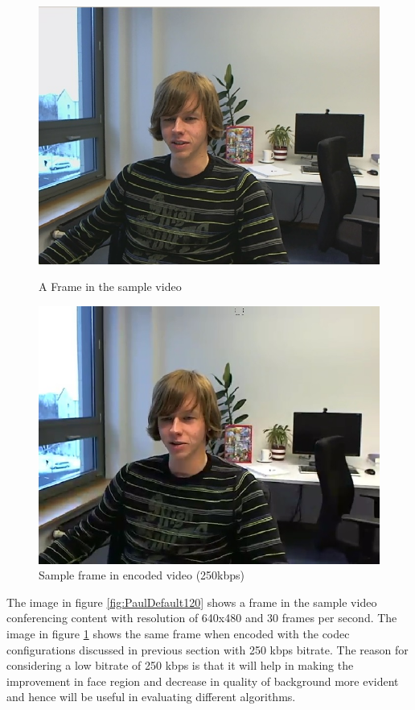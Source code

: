 \documentclass[11pt]{article} %
\begin{document}
\begin{figure}[!h]
    \centering
    \includegraphics[scale=0.5]{PaulDefault120}
    \caption{A Frame in the sample video}
    \label{fig:PaulDefault120}
    \includegraphics[scale=0.5]{PaulDefault120_91250kbps}
    \caption{Sample frame in encoded video (250kbps)}
    \label{fig:PaulDefaultencoded}
\end{figure} 

The image in figure \ref{fig:PaulDefault120} shows a frame in the sample video conferencing content with resolution of 640x480 and 30 frames per second. The image in figure \ref{fig:PaulDefaultencoded} shows the same frame when encoded with the codec configurations discussed in previous section with 250 kbps bitrate. The reason for considering a low bitrate of 250 kbps is that it will help in making the improvement in face region and decrease in quality of background more evident and hence will be useful in evaluating different algorithms. 
\end{document}
